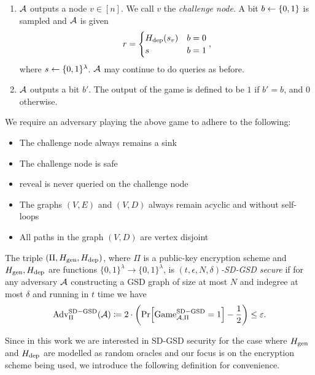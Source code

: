 \begin{definition}
\begin{enumerate}[1.]
		\item $\mathcal{A}$ outputs a node $v \in [n]$. We call $v$ the \emph{challenge node}. A bit $b \leftarrow \{0, 1\}$ is sampled and $\mathcal{A}$ is given
		      \[
			      r = \begin{cases}
				      H_\mathrm{dep}(s_v) & b = 0 \\
				      s          & b = 1
			      \end{cases},
		      \]
		      where $s \leftarrow \{0, 1\}^\lambda$. $\mathcal{A}$ may continue to do queries as before.
		\item \label{def:sd-gsd-game-step-4} $\mathcal{A}$ outputs a bit $b'$. The output of the game is defined to be $1$ if $b' = b$, and $0$ otherwise.
	\end{enumerate}

	We require an adversary playing the above game to adhere to the following:
	\begin{itemize}
		\item The challenge node always remains a sink 
		\item The challenge node is safe
		\item $\mathrm{reveal}$ is never queried on the challenge node 
		\item The graphs $(V, E)$ and $(V, D)$ always remain acyclic and without self-loops
		\item All paths in the graph $(V, D)$ are vertex disjoint 
	\end{itemize}
\end{definition}


\begin{definition}
	The triple $(\Pi, H_\mathrm{gen}, H_\mathrm{dep})$, where $\Pi$ is a public-key encryption scheme and $H_\mathrm{gen}, H_\mathrm{dep}$ are functions $\{0, 1\}^\lambda \to \{0, 1\}^\lambda$, is \emph{$(t, \epsilon, N, \delta)$-SD-GSD secure} if for any adversary $\mathcal{A}$ constructing a GSD graph of size at most $N$ and indegree at most $\delta$ and running in $t$ time we have
	\begin{align*}
		\mathrm{Adv}_{\Pi}^{\mathrm{SD-GSD}}(\adv) \coloneqq 2 \cdot \left(\pr{\mathrm{Game}_{\adv, \Pi}^{\mathrm{SD-GSD}} = 1} - \frac{1}{2}\right) \le \epsilon.
	\end{align*}
\end{definition}

Since in this work we are interested in SD-GSD security for the case where $H_\mathrm{gen}$ and $H_\mathrm{dep}$ are modelled as random oracles and our focus is on the encryption scheme being used, we introduce the following definition for convenience.

